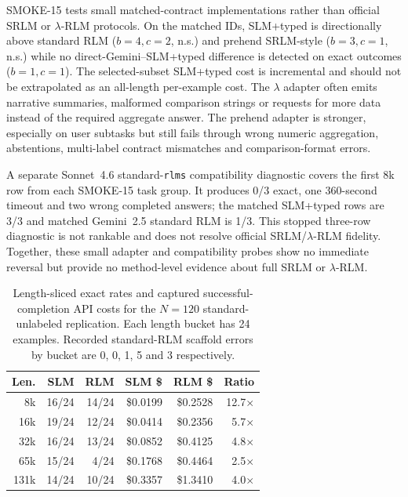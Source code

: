 \documentclass[letterpaper]{article}
\begin{document}
SMOKE-15 tests small matched-contract implementations rather than official SRLM or $\lambda$-RLM protocols. On the matched IDs, SLM+typed is directionally above standard RLM ($b=4,c=2$, n.s.) and prehend SRLM-style ($b=3,c=1$, n.s.) while no direct-Gemini--SLM+typed difference is detected on exact outcomes ($b=1,c=1$). The selected-subset SLM+typed cost is incremental and should not be extrapolated as an all-length per-example cost. The $\lambda$ adapter often emits narrative summaries, malformed comparison strings or requests for more data instead of the required aggregate answer. The prehend adapter is stronger, especially on user subtasks but still fails through wrong numeric aggregation, abstentions, multi-label contract mismatches and comparison-format errors.

A separate Sonnet~4.6 standard-\texttt{rlms} compatibility diagnostic covers the first 8k row from each SMOKE-15 task group. It produces 0/3 exact, one 360-second timeout and two wrong completed answers; the matched SLM+typed rows are 3/3 and matched Gemini~2.5 standard RLM is 1/3. This stopped three-row diagnostic is not rankable and does not resolve official SRLM/$\lambda$-RLM fidelity. Together, these small adapter and compatibility probes show no immediate reversal but provide no method-level evidence about full SRLM or $\lambda$-RLM.

\begin{table}[t]
\centering
\small
\setlength{\tabcolsep}{2.7pt}
\begin{tabular}{@{}rrrrrr@{}}
\toprule
\textbf{Len.} & \textbf{SLM} & \textbf{RLM} & \textbf{SLM \$} & \textbf{RLM \$} & \textbf{Ratio} \\
\midrule
8k & 16/24 & 14/24 & \$0.0199 & \$0.2528 & 12.7$\times$ \\
16k & 19/24 & 12/24 & \$0.0414 & \$0.2356 & 5.7$\times$ \\
32k & 16/24 & 13/24 & \$0.0852 & \$0.4125 & 4.8$\times$ \\
65k & 15/24 & 4/24 & \$0.1768 & \$0.4464 & 2.5$\times$ \\
131k & 14/24 & 10/24 & \$0.3357 & \$1.3410 & 4.0$\times$ \\
\bottomrule
\end{tabular}
\caption{Length-sliced exact rates and captured successful-completion API costs for the $N=120$ standard-unlabeled replication. Each length bucket has 24 examples. Recorded standard-RLM scaffold errors by bucket are 0, 0, 1, 5 and 3 respectively.}
\label{tab:supp-oolong-standard-n120-length}
\end{table}
\end{document}
